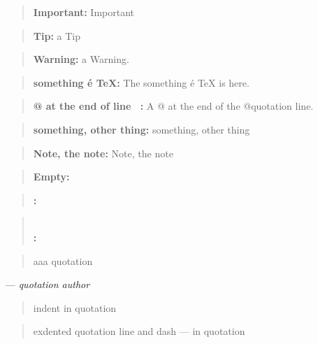 \documentclass{book}
\begin{document}
\begin{quote}
\textbf{Important:} Important
\end{quote}

\begin{quote}
\textbf{Tip:} a Tip
\end{quote}

\begin{quote}
\textbf{Warning:} a Warning.
\end{quote}

\begin{quote}
\textbf{something \'{e} \TeX{}:} The something \'{e} \TeX{} is here.
\end{quote}

\begin{quote}
\textbf{@ at the end of line \ {}:} A @ at the end of the @quotation line.
\end{quote}

\begin{quote}
\textbf{something, other thing:} something, other thing
\end{quote}

\begin{quote}
\textbf{Note, the note:} Note, the note
\end{quote}

\begin{quote}
\end{quote}

\begin{quote}
\textbf{Empty:} \end{quote}

\begin{quote}
\textbf{:} \end{quote}

\begin{quote}
\textbf{\leavevmode{}\\:} \end{quote}

\begin{quote}
aaa quotation
\end{quote}
\begin{center}
--- \emph{quotation author}
\end{center}

\begin{quote}
indent in quotation
\end{quote}

\begin{quote}
exdented quotation line   and dash --- in quotation
\end{quote}
\end{document}
